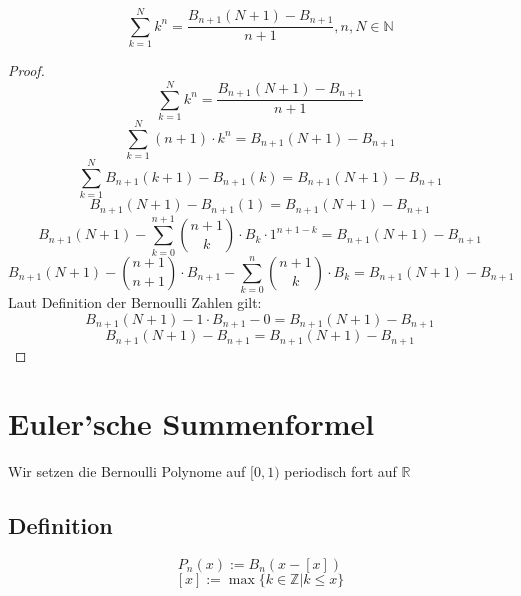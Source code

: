 \documentclass[12pt]{article}
\begin{document}
\begin{corollary}
\[\sum_{k=1}^N k^n = \frac{B_{n+1}(N+1)-B_{n+1}}{n+1}, n, N \in \mathbb{N}\]
\end{corollary}
\begin{proof}
\[\sum_{k=1}^N k^n = \frac{B_{n+1}(N+1) - B_{n+1}}{n+1}\]
\[\sum_{k=1}^N (n+1) \cdot k^n = B_{n+1}(N+1) - B_{n+1}\]
\[\sum_{k=1}^N B_{n+1}(k+1) - B_{n+1}(k) = B_{n+1}(N+1) - B_{n+1}\]
\[B_{n+1}(N+1) - B_{n+1}(1) = B_{n+1}(N+1) - B_{n+1}\]
\[B_{n+1}(N+1) - \sum_{k=0}^{n+1} {n+1 \choose k} \cdot B_k \cdot 1^{n+1-k} = B_{n+1}(N+1) - B_{n+1}\]
\[B_{n+1}(N+1) - {n+1 \choose n+1} \cdot B_{n+1} - \sum_{k=0}^{n} {n+1 \choose k} \cdot B_k = B_{n+1}(N+1) - B_{n+1}\]
Laut Definition der Bernoulli Zahlen gilt:
\[B_{n+1}(N+1) - 1 \cdot B_{n+1} - 0 = B_{n+1}(N+1) - B_{n+1}\]
\[B_{n+1}(N+1) - B_{n+1} = B_{n+1}(N+1) - B_{n+1}\]
\end{proof}

\section{Euler'sche Summenformel}

Wir setzen die Bernoulli Polynome auf \([0,1)\) periodisch fort auf \(\mathbb{R}\)

\subsection{Definition}

\[P_n(x) := B_n(x-[x])\]
\[[x] := \max \{ k \in \mathbb{Z} | k \leq x \} \]
\end{document}
